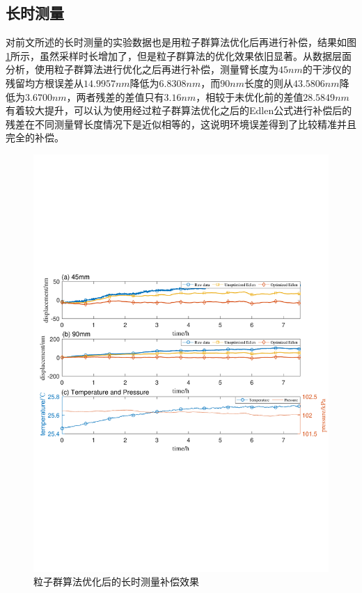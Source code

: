 \subsection{长时测量}
对前文所述的长时测量的实验数据也是用粒子群算法优化后再进行补偿，结果如图\ref{fig:粒子群算法优化后的长时测量补偿效果}所示，虽然采样时长增加了，但是粒子群算法的优化效果依旧显著。从数据层面分析，使用粒子群算法进行优化之后再进行补偿，测量臂长度为$45nm$的干涉仪的残留均方根误差从$14.9957nm$降低为$6.8308 nm$，而$90nm$长度的则从$43.5806nm$降低为$3.6700nm$，两者残差的差值只有$3.16nm$，相较于未优化前的差值$28.5849nm$有着较大提升，可以认为使用经过粒子群算法优化之后的Edlen公式进行补偿后的残差在不同测量臂长度情况下是近似相等的，这说明环境误差得到了比较精准并且完全的补偿。
\begin{figure}[htb]
  \centering
  \includegraphics[width=14cm]{fig/4-fig/edpso_长时测量实验数据.pdf}
  \caption{粒子群算法优化后的长时测量补偿效果}
  \label{fig:粒子群算法优化后的长时测量补偿效果}
\end{figure}

